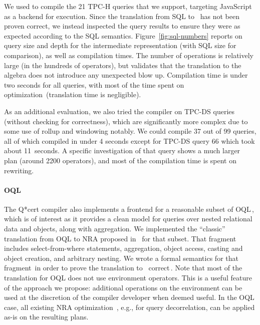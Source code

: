We used \projectname{} to compile the 21 TPC-H queries that we
support, targeting JavaScript as a backend for execution. Since the
translation from SQL to \NRAEnv\ has not been proven correct, we
instead inspected the query results to ensure they were as expected
according to the SQL semantics. Figure~\ref{fig:sql-numbers} reports
on query size and depth for the \NRAEnv intermediate
representation (with SQL size for comparison), as well as compilation
times. The number of operations is relatively large (in the hundreds
of operators), but validates that the translation to the algebra does
not introduce any unexpected blow up. Compilation time is under two
seconds for all queries, with most of the time spent on
optimization~(translation time is negligible).

As an additional evaluation, we also tried the compiler on TPC-DS
queries (without checking for correctness), which are significantly
more complex due to some use of rollup and windowing notably. We could
compile 37 out of 99 queries, all of which compiled in under 4 seconds
except for TPC-DS query 66 which took about 11~seconds. A specific
investigation of that query shows a much larger \NRAEnv\,plan (around
2200 operators), and most of the compilation time is spent on
rewriting.

\paragraph*{OQL}

The Q*cert compiler also implements a frontend for a reasonable subset
of OQL\,, which is of interest as it
provides a clean model for queries over nested relational data and
objects, along with aggregation. We implemented the ``classic''
translation from OQL to NRA proposed in~\cite{CluetM93} for that
subset. That fragment includes select-from-where statements,
aggregation, object access, casting and object creation, and arbitrary
nesting. We wrote a formal semantics for that
fragment\, in order to prove the
translation to
\NRAEnv\ correct\,. Note
that most of the translation for OQL does not use environment
operators. This is a useful feature of the approach we propose:
additional operations on the environment can be used at the discretion
of the compiler developer when deemed useful. In the OQL case, all
existing NRA optimization~\cite{CluetM93}, e.g., for query
decorrelation, can be applied as-is on the resulting plans.

